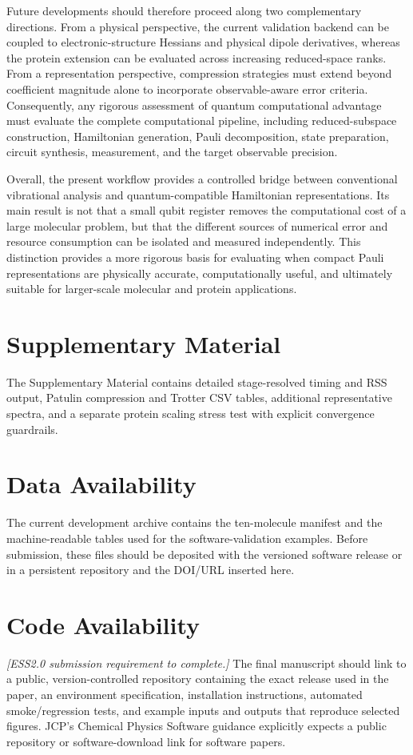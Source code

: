 \documentclass[aip,jcp,reprint,amsmath,amssymb,floatfix]{revtex4-2}
\begin{document}
Future developments should therefore proceed along two complementary directions.
From a physical perspective, the current validation backend can be coupled to
electronic-structure Hessians and physical dipole derivatives, whereas the 
protein extension can be evaluated across increasing reduced-space ranks. 
From a representation perspective, compression strategies must extend beyond 
coefficient magnitude alone to incorporate observable-aware error criteria. 
Consequently, any rigorous assessment of quantum computational advantage 
must evaluate the complete computational pipeline, including reduced-subspace
construction, Hamiltonian generation, Pauli decomposition, state preparation,
circuit synthesis, measurement, and the target observable precision.

Overall, the present workflow provides a controlled bridge between
conventional vibrational analysis and quantum-compatible Hamiltonian
representations. Its main result is not that a small qubit register removes
the computational cost of a large molecular problem, but that the different
sources of numerical error and resource consumption can be isolated and
measured independently. This distinction provides a more rigorous basis for
evaluating when compact Pauli representations are physically accurate,
computationally useful, and ultimately suitable for larger-scale molecular
and protein applications.
\section*{Supplementary Material}
The Supplementary Material contains detailed stage-resolved timing and RSS output, Patulin compression and Trotter CSV tables, additional representative spectra, and a separate protein scaling stress test with explicit convergence guardrails.

\section*{Data Availability}
The current development archive contains the ten-molecule manifest and the machine-readable tables used for the software-validation examples. Before submission, these files should be deposited with the versioned software release or in a persistent repository and the DOI/URL inserted here.

\section*{Code Availability}
\textit{[ESS2.0 submission requirement to complete.]} The final manuscript should link to a public, version-controlled repository containing the exact release used in the paper, an environment specification, installation instructions, automated smoke/regression tests, and example inputs and outputs that reproduce selected figures. JCP's Chemical Physics Software guidance explicitly expects a public repository or software-download link for software papers.\cite{Sherrill2021Software}
\end{document}
